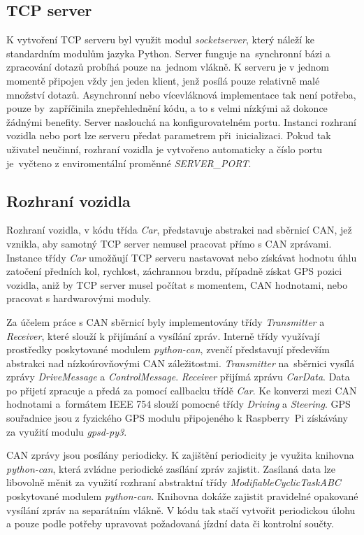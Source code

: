 \documentclass[czech, bachelor]{diploma}
\begin{document}
\subsection{TCP server}
K vytvoření TCP serveru byl využit modul \emph{socketserver}, který náleží ke standardním modulům jazyka Python. Server funguje
na~synchronní bázi a zpracování dotazů probíhá pouze na~jednom vlákně. K serveru je v jednom momentě připojen vždy jen jeden
klient, jenž posílá pouze relativně malé množství dotazů. Asynchronní nebo vícevláknová implementace tak není potřeba, pouze
by~zapříčinila znepřehlednění kódu, a to s velmi nízkými až dokonce žádnými benefity. Server naslouchá na konfigurovatelném portu.
Instanci rozhraní vozidla nebo port lze serveru předat parametrem při~inicializaci. Pokud tak uživatel neučinní, rozhraní vozidla
je vytvořeno automaticky a číslo portu je~vyčteno z enviromentální proměnné \emph{SERVER\_PORT}.

\subsection{Rozhraní vozidla}
Rozhraní vozidla, v kódu třída \emph{Car}, představuje abstrakci nad sběrnicí CAN, jež vznikla, aby samotný TCP server nemusel
pracovat přímo s CAN zprávami. Instance třídy \emph{Car} umožňují TCP serveru nastavovat nebo získávat hodnotu úhlu zatočení
předních kol, rychlost, záchrannou brzdu, případně získat GPS pozici vozidla, aniž by TCP server musel počítat s momentem, CAN
hodnotami, nebo pracovat s hardwarovými moduly.

Za účelem práce s CAN sběrnicí byly implementovány třídy \emph{Transmitter} a \emph{Receiver}, které slouží k přijímání a vysílání
zpráv. Interně třídy využívají prostředky poskytované modulem \emph{python-can}, zvenčí představují především abstrakci
nad nízkoúrovňovými CAN záležitostmi. \emph{Transmitter} na~sběrnici vysílá zprávy \emph{DriveMessage} a \emph{ControlMessage}.
\emph{Receiver} přijímá zprávu \emph{CarData}. Data po přijetí zpracuje a předá za pomocí callbacku třídě \emph{Car}. Ke konverzi
mezi CAN hodnotami a~formátem IEEE 754 \cite{floating-point-source} slouží pomocné třídy \emph{Driving} a \emph{Steering}. GPS
souřadnice jsou z fyzického GPS modulu připojeného k Raspberry~Pi získávány za využití modulu \emph{gpsd-py3}.

CAN zprávy jsou posílány periodicky. K zajištění periodicity je využita knihovna \emph{python-can}, která zvládne periodické
zasílání zpráv zajistit. Zasílaná data lze libovolně měnit za využití rozhraní abstraktní třídy \emph{ModifiableCyclicTaskABC}
poskytované modulem \emph{python-can}. Knihovna dokáže zajistit pravidelné opakované vysílání zpráv na separátním vlákně. V kódu
tak stačí vytvořit periodickou úlohu a pouze podle potřeby upravovat požadovaná jízdní data či kontrolní součty.
\end{document}

